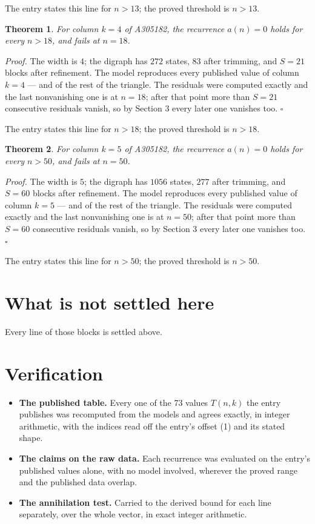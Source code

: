 \documentclass[11pt]{article}
\newtheorem{theorem}{Theorem}
\theoremstyle{definition}
\begin{document}
The entry states this line for $n > 13$; the proved threshold is $n > 13$.

\begin{theorem} For column $k = 4$ of A305182, the recurrence $a(n) = 0$ holds for every $n > 18$, and fails at $n = 18$.\end{theorem}

{\itshape Proof.} The width is $4$; the digraph has $272$ states, $83$ after trimming, and $S = 21$ blocks after refinement. The model reproduces every published value of column $k = 4$ --- and of the rest of the triangle. The residuals were computed exactly and the last nonvanishing one is at $n = 18$; after that point more than $S = 21$ consecutive residuals vanish, so by Section 3 every later one vanishes too. $\square$

The entry states this line for $n > 18$; the proved threshold is $n > 18$.

\begin{theorem} For column $k = 5$ of A305182, the recurrence $a(n) = 0$ holds for every $n > 50$, and fails at $n = 50$.\end{theorem}

{\itshape Proof.} The width is $5$; the digraph has $1056$ states, $277$ after trimming, and $S = 60$ blocks after refinement. The model reproduces every published value of column $k = 5$ --- and of the rest of the triangle. The residuals were computed exactly and the last nonvanishing one is at $n = 50$; after that point more than $S = 60$ consecutive residuals vanish, so by Section 3 every later one vanishes too. $\square$

The entry states this line for $n > 50$; the proved threshold is $n > 50$.

\section{What is not settled here}

Every line of those blocks is settled above.

\section{Verification}

\begin{itemize}

\item {\bfseries The published table.} Every one of the 73 values $T(n,k)$ the entry publishes was recomputed from the models and agrees exactly, in integer arithmetic, with the indices read off the entry's offset (1) and its stated shape.

\item {\bfseries The claims on the raw data.} Each recurrence was evaluated on the entry's published values alone, with no model involved, wherever the proved range and the published data overlap.

\item {\bfseries The annihilation test.} Carried to the derived bound for each line separately, over the whole vector, in exact integer arithmetic.

\end{itemize}
\end{document}
